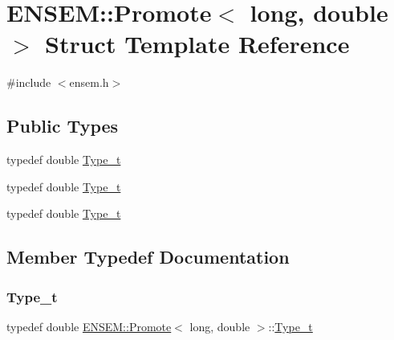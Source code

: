 \hypertarget{structENSEM_1_1Promote_3_01long_00_01double_01_4}{}\section{E\+N\+S\+EM\+:\+:Promote$<$ long, double $>$ Struct Template Reference}
\label{structENSEM_1_1Promote_3_01long_00_01double_01_4}


{\ttfamily \#include $<$ensem.\+h$>$}

\subsection*{Public Types}
\begin{DoxyCompactItemize}
\item 
typedef double \mbox{\hyperlink{structENSEM_1_1Promote_3_01long_00_01double_01_4_ab96351d39563d95f7a63ce59e9fe2e9d}{Type\+\_\+t}}
\item 
typedef double \mbox{\hyperlink{structENSEM_1_1Promote_3_01long_00_01double_01_4_ab96351d39563d95f7a63ce59e9fe2e9d}{Type\+\_\+t}}
\item 
typedef double \mbox{\hyperlink{structENSEM_1_1Promote_3_01long_00_01double_01_4_ab96351d39563d95f7a63ce59e9fe2e9d}{Type\+\_\+t}}
\end{DoxyCompactItemize}


\subsection{Member Typedef Documentation}
\mbox{\label{structENSEM_1_1Promote_3_01long_00_01double_01_4_ab96351d39563d95f7a63ce59e9fe2e9d}} 
\subsubsection{\texorpdfstring{Type\_t}{Type\_t}\hspace{0.1cm}{\footnotesize\ttfamily [1/3]}}
{\footnotesize\ttfamily typedef double \mbox{\hyperlink{structENSEM_1_1Promote}{E\+N\+S\+E\+M\+::\+Promote}}$<$ long, double $>$\+::\mbox{\hyperlink{structENSEM_1_1Promote_3_01long_00_01double_01_4_ab96351d39563d95f7a63ce59e9fe2e9d}{Type\+\_\+t}}}

